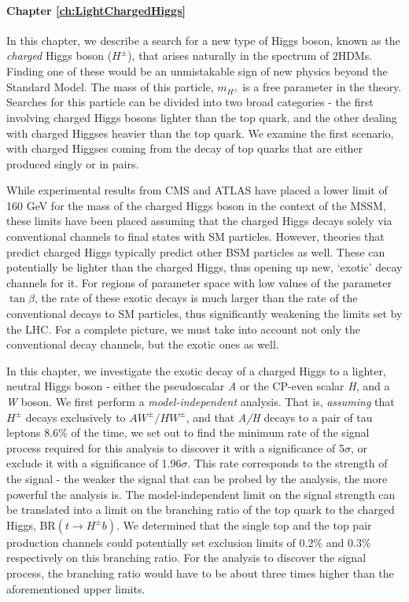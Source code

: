 \paragraph{Chapter \ref{ch:LightChargedHiggs}} 
In this chapter, we describe a search for a new type of Higgs boson, known as the \emph{charged} Higgs boson ($H^\pm$), that arises naturally in the spectrum of $2$HDMs. Finding one of these would be an unmistakable sign of new physics beyond the Standard Model. The mass of this particle, $m_{H^\pm}$ is a free parameter in the theory. Searches for this particle can be divided into two broad categories - the first involving charged Higgs bosons lighter than the top quark, and the other dealing with charged Higgses heavier than the top quark. We examine the first scenario, with charged Higgses coming from the decay of top quarks that are either produced singly or in pairs.

While experimental results from CMS and ATLAS  have placed a lower limit of 160 GeV for the mass of the charged Higgs boson in the context of the MSSM, these limits have been placed assuming that the charged Higgs decays solely via conventional channels to final states with SM particles. However, theories that predict charged Higgs typically predict other BSM particles as well. These can potentially be lighter than the charged Higgs, thus opening up new, `exotic' decay channels for it. For regions of parameter space with low values of the parameter $\tan\beta$, the rate of these exotic decays is much larger than the rate of the conventional decays to SM particles, thus significantly weakening the limits set by the LHC. For a complete picture, we must take into account not only the conventional decay channels, but the exotic ones as well. 

In this chapter, we investigate the exotic decay of a charged Higgs to a lighter, neutral Higgs boson - either the pseudoscalar \emph{A} or the CP-even scalar \emph{H}, and a \emph{W} boson. 
We first perform a \emph{model-independent} analysis. That is, \emph{assuming} that $H^\pm$ decays exclusively to $AW^\pm/HW^\pm$, and that \emph{A/H} decays to a pair of tau leptons 8.6\% of the time, we set out to find the minimum rate of the signal process required for this analysis to discover it with a significance of 5$\sigma$, or exclude it with a significance of 1.96$\sigma$. This rate corresponds to the strength of the signal - the weaker the signal that can be probed by the analysis, the more powerful the analysis is. The model-independent limit on the signal strength can be translated into a limit on the branching ratio of the top quark to the charged Higgs, BR$(t\rightarrow H^\pm b)$. We determined that the single top and the top pair production channels could potentially set exclusion limits of 0.2\% and 0.3\% respectively on this branching ratio. For the analysis to discover the signal process, the branching ratio would have to be about three times higher than the aforementioned upper limits. 

